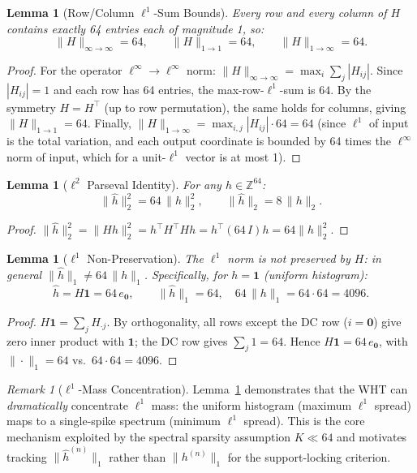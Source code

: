 \documentclass[12pt,letterpaper]{article}
\theoremstyle{definition}
\theoremstyle{plain}
\newtheorem{lemma}[theorem]{Lemma}
\theoremstyle{remark}
\newtheorem*{remark}{Remark}
\newcommand{\hhat}{\hat{h}}
\begin{document}
\begin{lemma}[Row/Column $\ell^1$-Sum Bounds]
\label{lem:l1-infty}
Every row and every column of $H$ contains exactly 64 entries each of
magnitude 1, so:
\[
  \|H\|_{\infty\to\infty} = 64,
  \qquad
  \|H\|_{1\to 1}   = 64,
  \qquad
  \|H\|_{1\to\infty} = 64.
\]
\end{lemma}

\begin{proof}
For the operator $\ell^\infty\!\to\!\ell^\infty$ norm:
$\|H\|_{\infty\to\infty} = \max_i \sum_j |H_{ij}|$.
Since $|H_{ij}|=1$ and each row has 64 entries, the max-row-$\ell^1$-sum
is $64$.
By the symmetry $H=H^\top$ (up to row permutation), the same holds for
columns, giving $\|H\|_{1\to 1}=64$.
Finally, $\|H\|_{1\to\infty} = \max_{i,j}|H_{ij}|\cdot 64 = 64$ (since
$\ell^1$ of input is the total variation, and each output coordinate is
bounded by 64 times the $\ell^\infty$ norm of input, which for a
unit-$\ell^1$ vector is at most 1).
\end{proof}

\begin{lemma}[$\ell^2$ Parseval Identity]
\label{lem:parseval}
For any $h \in \mathbb{Z}^{64}$:
\[
  \|\hhat\|_2^2 = 64\,\|h\|_2^2, \qquad
  \|\hhat\|_2   = 8\,\|h\|_2.
\]
\end{lemma}

\begin{proof}
$\|\hhat\|_2^2 = \|Hh\|_2^2 = h^\top H^\top H h = h^\top (64\,I) h = 64\|h\|_2^2$.
\end{proof}

\begin{lemma}[$\ell^1$ Non-Preservation]
\label{lem:l1-nonpreservation}
The $\ell^1$ norm is \emph{not} preserved by $H$: in general
$\|\hhat\|_1 \ne 64\,\|h\|_1$.  Specifically, for $h=\mathbf{1}$
(uniform histogram):
\[
  \hhat = H\mathbf{1} = 64\,e_{\mathbf{0}}, \qquad
  \|\hhat\|_1 = 64, \quad
  64\,\|h\|_1 = 64\cdot 64 = 4096.
\]
\end{lemma}

\begin{proof}
$H\mathbf{1} = \sum_j H_{\cdot j}$.  By orthogonality, all rows except
the DC row ($i=\mathbf{0}$) give zero inner product with $\mathbf{1}$; the
DC row gives $\sum_j 1 = 64$.  Hence $H\mathbf{1} = 64\,e_{\mathbf{0}}$,
with $\|\cdot\|_1 = 64$ vs.\ $64\cdot 64 = 4096$.
\end{proof}

\begin{remark}[$\ell^1$-Mass Concentration]
\label{rem:l1-conc}
Lemma~\ref{lem:l1-nonpreservation} demonstrates that the WHT can
\emph{dramatically} concentrate $\ell^1$ mass: the uniform histogram
(maximum $\ell^1$ spread) maps to a single-spike spectrum
(minimum $\ell^1$ spread). This is the core mechanism exploited by
the spectral sparsity assumption $K \ll 64$ and motivates tracking
$\|\hhat^{(n)}\|_1$ rather than $\|h^{(n)}\|_1$ for the
support-locking criterion.
\end{remark}
\end{document}
